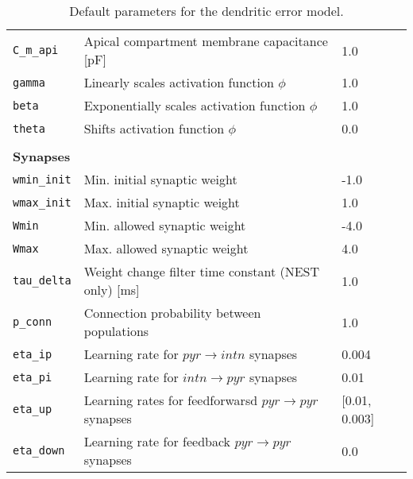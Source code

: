 \begin{table}
\begin{center}
\begin{tabular}{p{}p{}p{}}
      \\
      \texttt{C\_m\_api}           & Apical compartment membrane capacitance [pF]                                & 1.0
      \\
      \texttt{gamma}               & Linearly scales  activation function $\phi$                                 & 1.0
      \\
      \texttt{beta}                & Exponentially scales  activation function $\phi$                            & 1.0
      \\
      \texttt{theta}               & Shifts  activation function $\phi$                                          & 0.0
      \\

      \\
      \textbf{Synapses}
      \\\hline
      \texttt{wmin\_init}          & Min. initial synaptic weight                                                & -1.0
      \\
      \texttt{wmax\_init}          & Max. initial synaptic weight                                                & 1.0
      \\
      \texttt{Wmin}                & Min. allowed synaptic weight                                                & -4.0
      \\
      \texttt{Wmax}                & Max. allowed synaptic weight                                                & 4.0
      \\
      \texttt{tau\_delta}          & Weight change filter time constant (NEST only) [ms]                         & 1.0
      \\

      \texttt{p\_conn}             & Connection probability between populations                                  & 1.0
      \\
      \texttt{eta\_ip}             & Learning rate for $pyr\rightarrow intn$ synapses                            & 0.004
      \\
      \texttt{eta\_pi}             & Learning rate for $intn\rightarrow pyr$ synapses                            & 0.01
      \\
      \texttt{eta\_up}             & Learning rates for feedforwarsd $pyr\rightarrow pyr$ synapses               &
      [0.01, 0.003] \\
      \texttt{eta\_down}           & Learning rate for feedback $pyr\rightarrow pyr$ synapses                    & 0.0
      \\
    \end{tabular}\caption{Default parameters for the dendritic error model. }\label{tab-params}
  \end{center}
\end{table}
